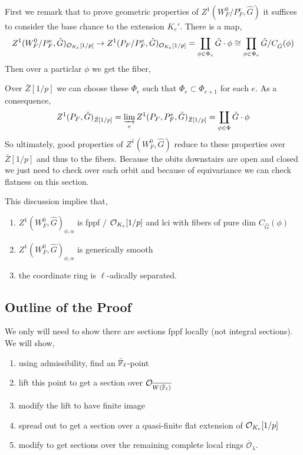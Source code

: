 \documentclass[12pt]{article}
\begin{document}
First we remark that to prove geometric properties of $Z^1(W_F^0/P_F^e, \hat{G})$ it suffices to consider the base chance to the extension $K_e'$. There is a map,
\[ Z^1(W_F^0/P_F^e, \hat{G})_{\mathcal{O}_{K_e}[1/p]} \to Z^1(P_F/P_F^e, \hat{G})_{\mathcal{O}_{K_e}[1/p]} = \coprod_{\phi \in \Phi_e} \hat{G} \cdot \phi \cong \prod_{\phi \in \Phi_e} \hat{G} / C_{\hat{G}}(\phi) \]
Then over a particlar $\phi$ we get the fiber,
\begin{center}
\end{center}
Over $\bar{Z}[1/p]$ we can choose these $\Phi_e$ such that $\Phi_e \subset \Phi_{e+1}$ for each $e$. As a consequence, 
\[ Z^1(P_F, \hat{G})_{\bar{Z}[1/p]} = \varinjlim_e Z^1(P_F, P_F^e, \hat{G})_{\bar{Z}[1/p]} = \coprod_{\phi \in \Phi} \hat{G} \cdot \phi \]
So ultimately, good properties of $Z^1(W_F^0, \hat{G})$ reduce to these properties over $\bar{Z}[1/p]$ and thus to the fibers. Because the obits downstairs are open and closed we just need to check over each orbit and because of equivariance we can check flatness on this section. 

\begin{theorem}
This discussion implies that,
\begin{enumerate}
\item $Z^1(W_F^0, \hat{G})_{\phi, \alpha}$ is fppf / $\mathcal{O}_{K_e}[1/p]$ and lci with fibers of pure dim $C_{\hat{G}}(\phi)$
\item $Z^1(W_F^0, \hat{G})_{\phi, \alpha}$ is generically smooth
\item the coordinate ring is $\ell$-adically separated. 
\end{enumerate}
\end{theorem}

\subsection{Outline of the Proof}

We only will need to show there are sections fppf locally (not integral sections). We will show,
\begin{enumerate}
\item using admissibility, find an $\bar{\mathbb{F}}_\ell$-point
\item lift this point to get a section over $\mathcal{O}_{\overline{W(\bar{\mathbb{F}}_\ell)}}$
\item modify the lift to have finite image 
\item spread out to get a section over a quasi-finite flat extension of $\mathcal{O}_{K_e}[1/p]$ 
\item modify to get sections over the remaining complete local rings $\overline{\mathcal{O}}_\lambda$. 
\end{enumerate}
\end{document}

